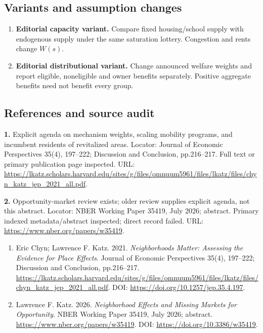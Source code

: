 \documentclass[11pt,a4paper]{article}
\begin{document}
\subsection*{Variants and assumption changes}
\begin{enumerate}
\item \textbf{Editorial capacity variant.} Compare fixed housing/school supply with endogenous supply under the same saturation lottery. Congestion and rents change \(W(s)\).
\item \textbf{Editorial distributional variant.} Change announced welfare weights and report eligible, noneligible and owner benefits separately. Positive aggregate benefits need not benefit every group.
\end{enumerate}
\subsection*{References and source audit}
\textbf{1.} Explicit agenda on mechanism weights, scaling mobility programs, and incumbent residents of revitalized areas. Locator: Journal of Economic Perspectives 35(4), 197–222; Discussion and Conclusion, pp.216–217. Full text or primary publication page inspected. URL: \url{https://lkatz.scholars.harvard.edu/sites/g/files/omnuum5961/files/lkatz/files/chyn_katz_jep_2021_all.pdf}.

\textbf{2.} Opportunity-market review exists; older review supplies explicit agenda, not this abstract. Locator: NBER Working Paper 35419, July 2026; abstract. Primary indexed metadata/abstract inspected; direct record failed. URL: \url{https://www.nber.org/papers/w35419}.
\begin{enumerate}\raggedright
\item\hypertarget{definitions:source:30007746:1}{} Eric Chyn; Lawrence F. Katz. 2021. \emph{Neighborhoods Matter: Assessing the Evidence for Place Effects}. Journal of Economic Perspectives 35(4), 197–222; Discussion and Conclusion, pp.216–217.
\url{https://lkatz.scholars.harvard.edu/sites/g/files/omnuum5961/files/lkatz/files/chyn_katz_jep_2021_all.pdf}.
DOI: \url{https://doi.org/10.1257/jep.35.4.197}.
\item\hypertarget{definitions:source:30007746:2}{} Lawrence F. Katz. 2026. \emph{Neighborhood Effects and Missing Markets for Opportunity}. NBER Working Paper 35419, July 2026; abstract.
\url{https://www.nber.org/papers/w35419}.
DOI: \url{https://doi.org/10.3386/w35419}.
\end{enumerate}
\end{document}
